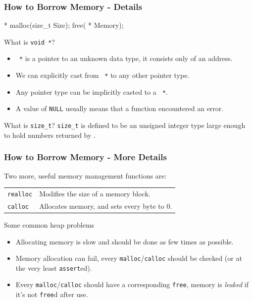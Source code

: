 \documentclass[smaller,table]{beamer}
\begin{document}
\begin{frame}[fragile]
\frametitle{How to Borrow Memory - Details}
\begin{semiverbatim}
       * malloc(size_t Size);
       free( * Memory);
\end{semiverbatim}
\begin{block}{What is {\tt void *}?}
\begin{itemize}
\item {\tt {} *} is a pointer to an unknown data type, it consists only of an address.
\item We can explicitly cast from {\tt {} *} to any other pointer type.
\item Any pointer type can be implicitly casted to a {\tt {} *}.
\item A value of {\tt NULL} usually means that a function encountered an error.
\end{itemize}
\end{block}

\begin{block}{What is {\tt size\_t}?}
{\tt size\_t} is defined to be an unsigned integer type large enough to hold numbers returned by {\tt {}}.
\end{block}
\end{frame}

\begin{frame}
\frametitle{How to Borrow Memory - More Details}
Two more, useful memory management functions are:
\begin{center}
\begin{tabular}{l l}
\tt realloc&Modifies the size of a memory block.\\
\tt calloc&Allocates memory, and sets every byte to 0.\\
\end{tabular}
\end{center}
\begin{alertblock}{Some common heap problems}
\begin{itemize}
\item Allocating memory is slow and should be done as few times as possible.
\item Memory allocation can fail, every {\tt malloc}/{\tt calloc} should be checked (or at the very least {\tt assert}ed).
\item Every {\tt malloc}/{\tt calloc} should have a corresponding {\tt free}, memory is \emph{leaked} if it's not {\tt free}d after use.
\end{itemize}
\end{alertblock}
\end{frame}
\end{document}
